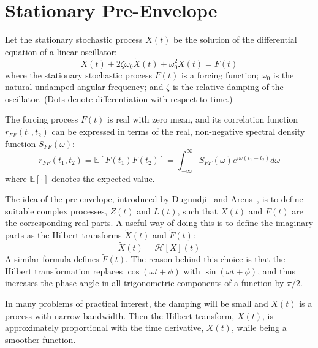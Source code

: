 \documentclass[12pt]{article}
\begin{document}
\section{Stationary Pre-Envelope}

Let the stationary stochastic process $X(t)$ be the solution of the differential equation of a linear oscillator:
\begin{equation}
    \ddot{X}(t) + 2\zeta \omega_0 \dot{X}(t) + \omega_0^2 X(t) = F(t)
    \label{eq:oscillator}
\end{equation}
where the stationary stochastic process $F(t)$ is a forcing function; $\omega_0$ is the natural undamped angular frequency; and $\zeta$ is the relative damping of the oscillator. (Dots denote differentiation with respect to time.)

The forcing process $F(t)$ is real with zero mean, and its correlation function $r_{FF}(t_1, t_2)$ can be expressed in terms of the real, non-negative spectral density function $S_{FF}(\omega)$:
\begin{equation}
    r_{FF}(t_1, t_2) = \mathbb{E}[F(t_1)F(t_2)] = \int_{-\infty}^{\infty} S_{FF}(\omega) e^{i\omega(t_1-t_2)} d\omega
    \label{eq:correlation}
\end{equation}
where $\mathbb{E}[\cdot]$ denotes the expected value.

The idea of the pre-envelope, introduced by Dugundji~\cite{dugundji1958} and Arens~\cite{arens1957}, is to define suitable complex processes, $Z(t)$ and $L(t)$, such that $X(t)$ and $F(t)$ are the corresponding real parts. A useful way of doing this is to define the imaginary parts as the Hilbert transforms $\tilde{X}(t)$ and $\tilde{F}(t)$:
\begin{equation}
    \tilde{X}(t) = \mathcal{H}[X](t)
    \label{eq:hilbert}
\end{equation}
A similar formula defines $\tilde{F}(t)$. The reason behind this choice is that the Hilbert transformation replaces $\cos(\omega t + \phi)$ with $\sin(\omega t + \phi)$, and thus increases the phase angle in all trigonometric components of a function by $\pi/2$.

In many problems of practical interest, the damping will be small and $X(t)$ is a process with narrow bandwidth. Then the Hilbert transform, $\tilde{X}(t)$, is approximately proportional with the time derivative, $\dot{X}(t)$, while being a smoother function.
\end{document}
